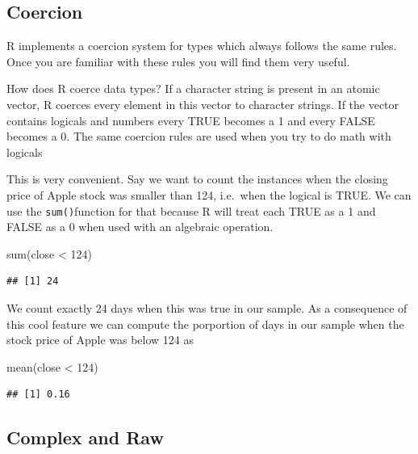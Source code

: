\documentclass[
]{book}
\newenvironment{Shaded}{\begin{snugshade}}{\end{snugshade}}
\newcommand{\DecValTok}[1]{\textcolor[rgb]{0.00,0.00,0.81}{#1}}
\newcommand{\FunctionTok}[1]{\textcolor[rgb]{0.00,0.00,0.00}{#1}}
\newcommand{\NormalTok}[1]{#1}
\newcommand{\SpecialCharTok}[1]{\textcolor[rgb]{0.00,0.00,0.00}{#1}}
\begin{document}
\hypertarget{coercion}{%
\subsection{Coercion}\label{coercion}}

R implements a coercion system for types which always follows the same rules. Once you
are familiar with these rules you will find them very useful.

How does R coerce data types? If a character string is present in an atomic vector,
R coerces every element in this vector to character strings. If the vector contains
logicals and numbers every TRUE becomes a 1 and every FALSE becomes a 0. The same coercion
rules are used when you try to do math with logicals

This is very convenient. Say we want to count the instances when
the closing price of Apple stock was smaller than 124, i.e.~when the logical is TRUE.
We can use the \texttt{sum()}function
for that because R will treat each TRUE as a 1 and FALSE as a 0 when used with an algebraic
operation.

\begin{Shaded}
\begin{Highlighting}[]
\FunctionTok{sum}\NormalTok{(close }\SpecialCharTok{\textless{}} \DecValTok{124}\NormalTok{)}
\end{Highlighting}
\end{Shaded}

\begin{verbatim}
## [1] 24
\end{verbatim}

We count exactly 24 days when this was true in our sample. As a consequence of this cool
feature we can compute the porportion of days in our sample when the stock price of Apple
was below 124 as

\begin{Shaded}
\begin{Highlighting}[]
\FunctionTok{mean}\NormalTok{(close }\SpecialCharTok{\textless{}} \DecValTok{124}\NormalTok{)}
\end{Highlighting}
\end{Shaded}

\begin{verbatim}
## [1] 0.16
\end{verbatim}

\hypertarget{complex-and-raw}{%
\subsection{Complex and Raw}\label{complex-and-raw}}
\end{document}
